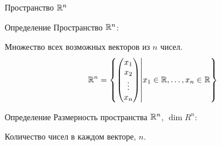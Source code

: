 \begin{frame}{Пространство $\mathbb{R}^n$}

\begin{block}{Определение} 
\alert{Пространство $\mathbb{R}^n$:}

Множество всех возможных векторов из $n$ чисел. 
 \[
 \mathbb{R}^n = \left\{ \begin{pmatrix}
 x_1 \\
 x_2 \\
 \vdots \\
 x_n \\
 \end{pmatrix} \middle| x_1 \in \mathbb{R}, \ldots, x_n \in \mathbb{R}
   \right\}  
 \]
\end{block}

\pause

\begin{block}{Определение} 
  \alert{Размерность} пространства $\mathbb{R}^n$, $\dim R^n$:

    Количество чисел в каждом векторе, $n$.
\end{block}
\end{frame}








